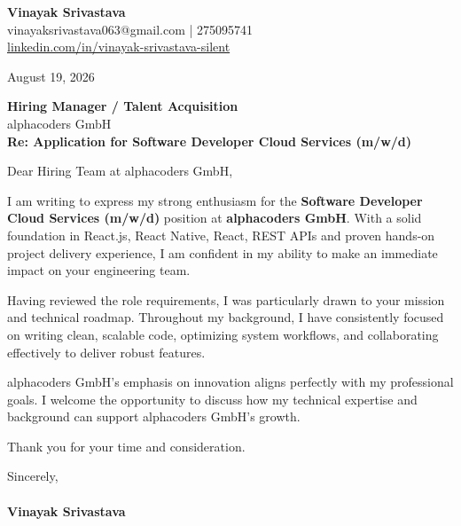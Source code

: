 \documentclass[11pt,a4paper]{article}
\begin{document}
\thispagestyle{empty}

{\Large \textbf{Vinayak Srivastava}}\\
vinayaksrivastava063@gmail.com | 275095741 \\
\url{linkedin.com/in/vinayak-srivastava-silent}

\vspace{1em}
\hfill August 19, 2026

\textbf{Hiring Manager / Talent Acquisition}\\
alphacoders GmbH\\

\vspace{1.5em}
\textbf{Re: Application for Software Developer Cloud Services (m/w/d)}

\vspace{1em}
Dear Hiring Team at alphacoders GmbH,

I am writing to express my strong enthusiasm for the \textbf{Software Developer Cloud Services (m/w/d)} position at \textbf{alphacoders GmbH}. With a solid foundation in React.js, React Native, React, REST APIs and proven hands-on project delivery experience, I am confident in my ability to make an immediate impact on your engineering team.

Having reviewed the role requirements, I was particularly drawn to your mission and technical roadmap. Throughout my background, I have consistently focused on writing clean, scalable code, optimizing system workflows, and collaborating effectively to deliver robust features.

alphacoders GmbH's emphasis on innovation aligns perfectly with my professional goals. I welcome the opportunity to discuss how my technical expertise and background can support alphacoders GmbH's growth.

Thank you for your time and consideration.

\vspace{1.5em}
Sincerely,\\
\vspace{1em}\\
\textbf{Vinayak Srivastava}
\end{document}
